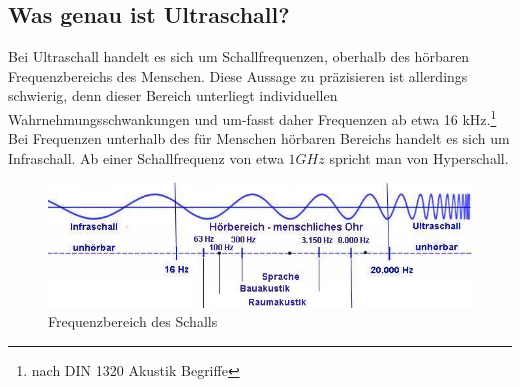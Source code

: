 \subsection{Was genau ist Ultraschall?}
Bei Ultraschall handelt es sich um Schallfrequenzen, oberhalb des hörbaren Frequenzbereichs des Menschen. Diese Aussage zu präzisieren ist allerdings schwierig, denn dieser Bereich unterliegt individuellen Wahrnehmungsschwankungen und um-fasst daher Frequenzen ab etwa 16 kHz.\footnote{nach DIN 1320 Akustik Begriffe} Bei Frequenzen unterhalb des für Menschen hörbaren Bereichs handelt es sich um Infraschall. Ab einer Schallfrequenz von etwa $1GHz$ spricht man von Hyperschall. 
\begin{figure}[H]
	\centering
	\includegraphics[scale=0.9]{images/hoerbarer_Schall-Infraschall-Ultraschall.jpg}
	\caption{Frequenzbereich des Schalls\footnotemark}
\end{figure}


